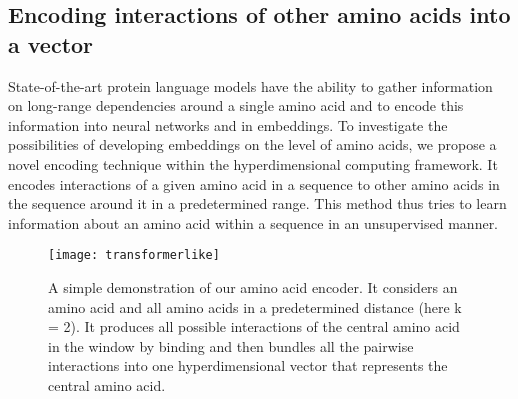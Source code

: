 \subsection*{Encoding interactions of other amino acids into a vector}
State-of-the-art protein language models have the ability to gather information on long-range dependencies around a single amino acid and to encode this information into neural networks and in embeddings. To investigate the possibilities of developing embeddings on the level of amino acids, we propose a novel encoding technique within the hyperdimensional computing framework. It encodes interactions of a given amino acid in a sequence to other amino acids in the sequence around it in a predetermined range. This method thus tries to learn information about an amino acid within a sequence in an unsupervised manner.
\begin{figure}[h!]
    \centering
    \texttt{[image: transformerlike]}
    \caption{A simple demonstration of our amino acid encoder. It considers an amino acid and all amino acids in a predetermined distance (here k = 2). It produces all possible interactions of the central amino acid in the window by binding and then bundles all the pairwise interactions into one hyperdimensional vector that represents the central amino acid.}
    \label{fig:AAtr}
\end{figure}